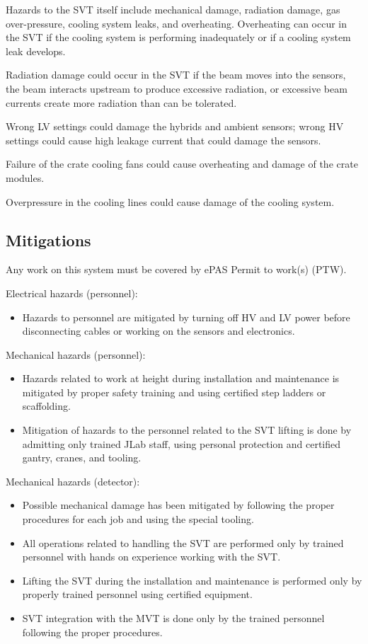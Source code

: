 Hazards to the SVT itself include mechanical damage, radiation damage, gas over-pressure, 
cooling system leaks, and overheating. Overheating can occur in the SVT  if the cooling 
system is performing inadequately or if a cooling system leak develops.

Radiation damage could occur in the SVT if the beam moves into the sensors, the beam interacts 
upstream to produce excessive radiation, or excessive beam currents create more radiation than 
can be tolerated. 

Wrong LV settings could damage the hybrids and ambient sensors; wrong HV settings could cause 
high leakage current that could damage the sensors.

Failure of the crate cooling fans could cause overheating and damage of the crate modules.

Overpressure in the cooling lines could cause damage of the cooling system.

\subsection{Mitigations}
Any work on this system must be covered by ePAS Permit to work(s) (PTW).

Electrical hazards (personnel):
\begin{itemize}
\item Hazards to personnel are mitigated by turning off HV and LV power before disconnecting 
cables or working on the sensors and electronics. 
\end{itemize}

Mechanical hazards (personnel):
\begin{itemize}
\item Hazards related to work at height during installation and maintenance is mitigated by 
proper safety training and using certified step ladders or scaffolding. 
\item Mitigation of hazards to the personnel related to the SVT lifting is done by admitting 
only trained JLab staff, using personal protection and certified gantry, cranes, and tooling.
\end{itemize}

Mechanical hazards (detector):
\begin{itemize}
\item Possible mechanical damage has been mitigated by following the proper procedures for each 
job and using the special tooling. 
\item All operations related to handling the SVT are performed only by trained personnel with 
hands on experience working with the SVT. 
\item Lifting the SVT during the installation and maintenance is performed only by properly 
trained personnel using certified equipment. 
\item SVT integration with the MVT is done only by the trained personnel following the proper 
procedures. 
\end{itemize}

